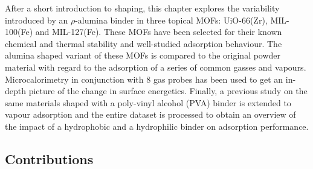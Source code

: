 After a short introduction to shaping, this chapter explores the 
variability introduced by an \( \rho \)-alumina binder in three 
topical MOFs: UiO-66(Zr), MIL-100(Fe) and MIL-127(Fe). These MOFs 
have been selected for their known chemical and thermal stability 
and well-studied adsorption behaviour.
The alumina shaped variant of these MOFs is compared to the original
powder material with regard to the adsorption of a series of common
gasses and vapours. Microcalorimetry in conjunction with 8 gas probes
has been used to get an in-depth picture of the change in surface
energetics.
Finally, a previous study on the same materials shaped with a poly-vinyl
alcohol (PVA) binder is extended to vapour adsorption and the entire
dataset is processed to obtain an overview of the impact of a
hydrophobic and a hydrophilic binder on adsorption performance.

\subsection*{Contributions}
